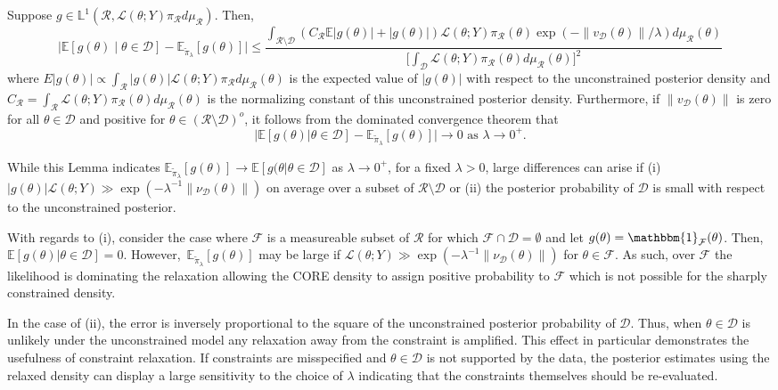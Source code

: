 \documentclass[10pt,fleqn]{article}
\newcommand{\bb}[1]{\mathbb{#1}} \newcommand{\mc}[1]{\mathcal{#1}}
\DeclareMathOperator{\1}{\mathbbm{1}} \DeclareMathOperator{\bigO}{\mc O}
\begin{document}
\begin{lemma} \label{THM:positive_measure_approximation_error} Suppose $g
\in \mathbb{L}^1(\mathcal{R},
\mathcal{L}(\theta;Y)\pi_\mathcal{R}d\mu_\mathcal{R})$.  Then,
$$\Big|\bb E[g(\theta) \mid \theta\in\mathcal{D}] -
\bb E_{\tilde{\pi}_\lambda}[g(\theta)]   \Big| \le
\frac{\int_{\mathcal{R}\setminus \mathcal{D}}
(C_\mathcal{R}\bb E|g(\theta)|+|g(\theta)|) \mathcal{L}(\theta; Y)
\pi_\mathcal{R}(\theta)\exp(-\|v_{\mc D}(\theta)\|/\lambda )
d\mu_\mathcal{R}(\theta)}{\big[\int_\mathcal{D} \mathcal{L}(\theta; Y)
\pi_\mathcal{R}(\theta)d\mu_\mathcal{R}(\theta)\big]^2 }$$ where
$E|g(\theta)| \propto \int_\mathcal{R} |g(\theta)|
\mathcal{L}(\theta;Y)\pi_\mathcal{R} d\mu_\mathcal{R}(\theta)$ is the
expected value of $|g(\theta)|$ with respect to the unconstrained posterior
density and $C_\mathcal{R} = \int_\mathcal{R}
\mathcal{L}(\theta;Y)\pi_\mathcal{R}(\theta)d\mu_\mathcal{R}(\theta)$ is
the normalizing constant of this unconstrained posterior density.
Furthermore, if $\|v_{\mc D}(\theta)\|$ is zero for all $\theta\in\mathcal{D}$ and
positive for $\theta\in(\mathcal{R}\setminus\mathcal{D})^o$, it follows
from the dominated convergence theorem that $$\big| \bb E[g(\theta)
|\theta\in\mathcal{D}] - \bb E_{\tilde{\pi}_\lambda}[g(\theta)]  \big|\to 0
\text{ as } \lambda \to 0^+.$$ \end{lemma}
While this Lemma indicates $\bb E_{\tilde{\pi}_\lambda}[g(\theta)] \to \bb E[g(\theta|\theta\in \mc D]$ as $\lambda \to 0^+$, for a fixed $\lambda>0$, large differences can arise if  (i) $|g(\theta)|\mathcal{L}(\theta;Y) \gg \exp(-\lambda^{-1} \|\nu_{\mc D}(\theta) \|)$ on average over a subset of $\mc R\setminus \mc D$ or (ii) the posterior probability of $\mc D$ is small with respect to the unconstrained posterior.  

With regards to (i), consider the case where $\mc F$ is a measureable subset of $\mc R$ for which $\mc F \cap \mc D = \emptyset$ and let $g(\theta) = \mathbbm{1}_{\mc F}(\theta)$. Then, $\bb E[g(\theta)|\theta\in \mc D]=0.$  However,\ $\bb E_{\tilde{\pi}_\lambda}[g(\theta)]$ may be large if $\mathcal{L}(\theta;Y) \gg \exp(-\lambda^{-1} \|\nu_{\mc D}(\theta) \|)$ for $\theta\in\mc F$.  As such, over $\mc F$ the likelihood is dominating the relaxation allowing the CORE density to assign positive probability to $\mc F$ which is not possible for the sharply constrained density.

In the case of (ii), the error is inversely proportional to the square of the unconstrained posterior probability of $\mc D.$ Thus, when $\theta \in \mc D$ is unlikely under the unconstrained model any relaxation away from the constraint is amplified.  This effect in particular demonstrates the usefulness of constraint relaxation. If constraints are misspecified and $\theta\in \mc D$ is not supported by the data, the posterior estimates using the relaxed density can display a large sensitivity to the choice of $\lambda$ indicating that the constraints themselves should be re-evaluated. 
\end{document}
